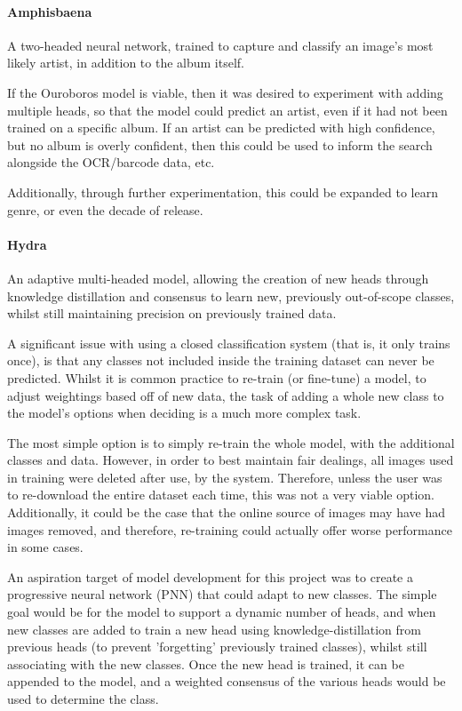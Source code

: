                 \paragraph{Amphisbaena} A two-headed neural network, trained to capture and classify an image's most likely artist, in addition to the album itself.
    
                If the Ouroboros model is viable, then it was desired to experiment with adding multiple heads, so that the model could predict an artist, even if it had not been trained on a specific album. If an artist can be predicted with high confidence, but no album is overly confident, then this could be used to inform the search alongside the OCR/barcode data, etc.
    
                Additionally, through further experimentation, this could be expanded to learn genre, or even the decade of release.
    
                \paragraph{Hydra} An adaptive multi-headed model, allowing the creation of new heads through knowledge distillation and consensus to learn new, previously out-of-scope classes, whilst still maintaining precision on previously trained data.
    
                A significant issue with using a closed classification system (that is, it only trains once), is that any classes not included inside the training dataset can never be predicted. Whilst it is common practice to re-train (or fine-tune) a model, to adjust weightings based off of new data, the task of adding a whole new class to the model's options when deciding is a much more complex task.
    
                The most simple option is to simply re-train the whole model, with the additional classes and data. However, in order to best maintain fair dealings, all images used in training were deleted after use, by the system. Therefore, unless the user was to re-download the entire dataset each time, this was not a very viable option. Additionally, it could be the case that the online source of images may have had images removed, and therefore, re-training could actually offer worse performance in some cases.
    
                An aspiration target of model development for this project was to create a progressive neural network (PNN) that could adapt to new classes. The simple goal would be for the model to support a dynamic number of heads, and when new classes are added to train a new head using knowledge-distillation from previous heads (to prevent 'forgetting' previously trained classes), whilst still associating with the new classes. Once the new head is trained, it can be appended to the model, and a weighted consensus of the various heads would be used to determine the class.
    
